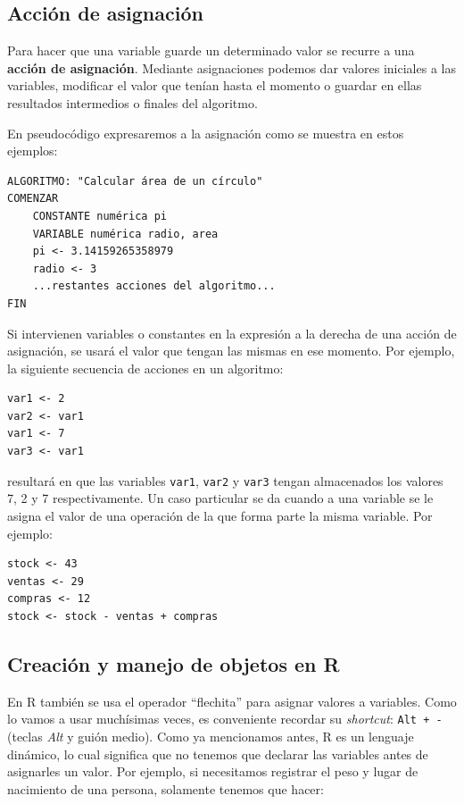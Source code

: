 \documentclass[
]{book}
\begin{document}
\hypertarget{acciuxf3n-de-asignaciuxf3n}{%
\subsection{Acción de asignación}\label{acciuxf3n-de-asignaciuxf3n}}

Para hacer que una variable guarde un determinado valor se recurre a una \textbf{acción de asignación}. Mediante asignaciones podemos dar valores iniciales a las variables, modificar el valor que tenían hasta el momento o guardar en ellas resultados intermedios o finales del algoritmo.

En pseudocódigo expresaremos a la asignación como se muestra en estos ejemplos:

\begin{verbatim}
ALGORITMO: "Calcular área de un círculo"
COMENZAR
    CONSTANTE numérica pi
    VARIABLE numérica radio, area
    pi <- 3.14159265358979
    radio <- 3
    ...restantes acciones del algoritmo...
FIN
\end{verbatim}

Si intervienen variables o constantes en la expresión a la derecha de una acción de asignación, se usará el valor que tengan las mismas en ese momento. Por ejemplo, la siguiente secuencia de acciones en un algoritmo:

\begin{verbatim}
var1 <- 2
var2 <- var1
var1 <- 7
var3 <- var1
\end{verbatim}

resultará en que las variables \texttt{var1}, \texttt{var2} y \texttt{var3} tengan almacenados los valores 7, 2 y 7 respectivamente. Un caso particular se da cuando a una variable se le asigna el valor de una operación de la que forma parte la misma variable. Por ejemplo:

\begin{verbatim}
stock <- 43
ventas <- 29
compras <- 12
stock <- stock - ventas + compras
\end{verbatim}

\hypertarget{objetosenR}{%
\subsection{Creación y manejo de objetos en R}\label{objetosenR}}

En R también se usa el operador ``flechita'' para asignar valores a variables. Como lo vamos a usar muchísimas veces, es conveniente recordar su \emph{shortcut}: \texttt{Alt\ +\ -} (teclas \emph{Alt} y guión medio). Como ya mencionamos antes, R es un lenguaje dinámico, lo cual significa que no tenemos que declarar las variables antes de asignarles un valor. Por ejemplo, si necesitamos registrar el peso y lugar de nacimiento de una persona, solamente tenemos que hacer:
\end{document}
